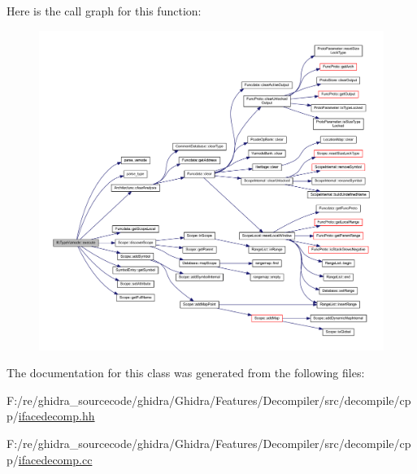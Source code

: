 Here is the call graph for this function\+:
\nopagebreak
\begin{figure}[H]
\begin{center}
\leavevmode
\includegraphics[width=350pt]{class_ifc_type_varnode_a121ff1e507f74d6ec86a07e120cd3ba8_cgraph}
\end{center}
\end{figure}


The documentation for this class was generated from the following files\+:\begin{DoxyCompactItemize}
\item 
F\+:/re/ghidra\+\_\+sourcecode/ghidra/\+Ghidra/\+Features/\+Decompiler/src/decompile/cpp/\mbox{\hyperlink{ifacedecomp_8hh}{ifacedecomp.\+hh}}\item 
F\+:/re/ghidra\+\_\+sourcecode/ghidra/\+Ghidra/\+Features/\+Decompiler/src/decompile/cpp/\mbox{\hyperlink{ifacedecomp_8cc}{ifacedecomp.\+cc}}\end{DoxyCompactItemize}
